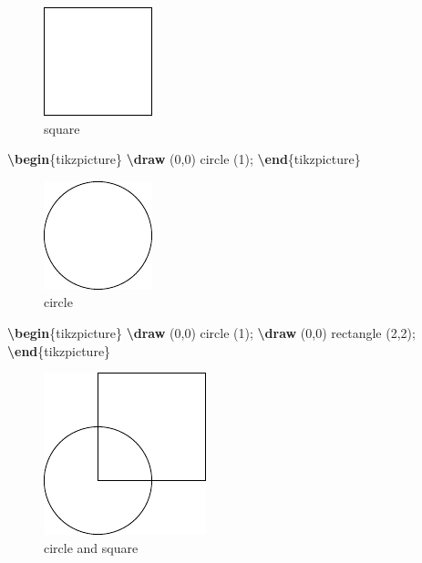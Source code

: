 \documentclass[
]{book}
\newenvironment{Shaded}{\begin{snugshade}}{\end{snugshade}}
\newcommand{\ExtensionTok}[1]{#1}
\newcommand{\FunctionTok}[1]{\textcolor[rgb]{0.13,0.29,0.53}{\textbf{#1}}}
\newcommand{\KeywordTok}[1]{\textcolor[rgb]{0.13,0.29,0.53}{\textbf{#1}}}
\newcommand{\NormalTok}[1]{#1}
\theoremstyle{definition}
\theoremstyle{definition}
\theoremstyle{definition}
\theoremstyle{definition}
\theoremstyle{remark}
\begin{document}
\begin{figure}
\includegraphics[width=0.25\linewidth]{202401311000-TikZ_files/figure-latex/unnamed-chunk-22-1} \caption{square}\label{fig:unnamed-chunk-22}
\end{figure}

\begin{Shaded}
\begin{Highlighting}[]
\KeywordTok{\textbackslash{}begin}\NormalTok{\{}\ExtensionTok{tikzpicture}\NormalTok{\}}
  \FunctionTok{\textbackslash{}draw}\NormalTok{ (0,0) circle (1);}
\KeywordTok{\textbackslash{}end}\NormalTok{\{}\ExtensionTok{tikzpicture}\NormalTok{\}}
\end{Highlighting}
\end{Shaded}

\begin{figure}
\includegraphics[width=0.25\linewidth]{202401311000-TikZ_files/figure-latex/unnamed-chunk-24-1} \caption{circle}\label{fig:unnamed-chunk-24}
\end{figure}

\begin{Shaded}
\begin{Highlighting}[]
\KeywordTok{\textbackslash{}begin}\NormalTok{\{}\ExtensionTok{tikzpicture}\NormalTok{\}}
  \FunctionTok{\textbackslash{}draw}\NormalTok{ (0,0) circle (1);}
  \FunctionTok{\textbackslash{}draw}\NormalTok{ (0,0) rectangle (2,2);}
\KeywordTok{\textbackslash{}end}\NormalTok{\{}\ExtensionTok{tikzpicture}\NormalTok{\}}
\end{Highlighting}
\end{Shaded}

\begin{figure}
\includegraphics[width=0.25\linewidth]{202401311000-TikZ_files/figure-latex/unnamed-chunk-26-1} \caption{circle and square}\label{fig:unnamed-chunk-26}
\end{figure}
\end{document}
